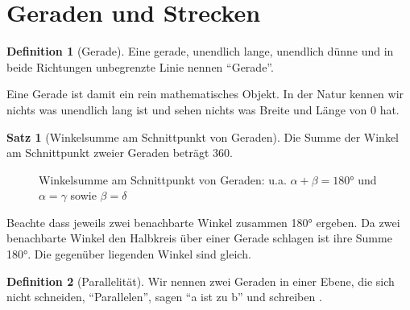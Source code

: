 \documentclass[a4paper]{book}%
\theoremstyle{definition}
\newtheorem{definition}{Definition}
\newtheorem{satz}{Satz}
\begin{document}
\section{Geraden und Strecken}

\begin{definition}[Gerade]\label{def:Gerade}
    Eine gerade, unendlich lange, unendlich dünne und in beide Richtungen unbegrenzte Linie nennen \enquote{Gerade}.
\end{definition}

Eine Gerade ist damit ein rein mathematisches Objekt. In der Natur kennen wir nichts was unendlich lang ist und sehen nichts was Breite und Länge von 0 hat.

\begin{satz}[Winkelsumme am Schnittpunkt von Geraden]
    Die Summe der Winkel am Schnittpunkt zweier Geraden beträgt 360.
\end{satz}

\begin{figure}
  \centering
  \caption{Winkelsumme am Schnittpunkt von Geraden: u.a. $\alpha + \beta = 180°$ und $\alpha = \gamma$ sowie $\beta = \delta$}\label{fig:WinkelsummeSchnittpunkt}
\end{figure}

Beachte dass jeweils zwei benachbarte Winkel zusammen 180° ergeben. Da zwei benachbarte Winkel den Halbkreis über einer Gerade schlagen ist ihre Summe 180°. Die gegenüber liegenden Winkel sind gleich.


\begin{definition}[Parallelität]\label{def:parallel}
    Wir nennen zwei Geraden in einer Ebene, die sich nicht schneiden, \enquote{Parallelen}, sagen \enquote{a ist  zu b} und schreiben .
\end{definition}
\end{document}
